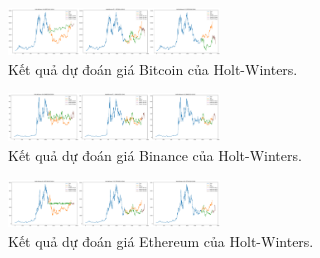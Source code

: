 \documentclass[conference]{IEEEtran}
\begin{document}
\subsubsection{}
\begin{figure}[H]
    \centering
    \includegraphics[width=0.5\textwidth]{bibliography/pictures/HWbtc.png}
    \caption{Kết quả dự đoán giá Bitcoin của Holt-Winters.}
\end{figure}
\begin{figure}[H]
    \centering
    \includegraphics[width=0.5\textwidth]{bibliography/pictures/HWbnb.png}
    \caption{Kết quả dự đoán giá Binance của Holt-Winters.}
\end{figure}
\begin{figure}[H]
    \centering
    \includegraphics[width=0.5\textwidth]{bibliography/pictures/HWeth.png}
    \caption{Kết quả dự đoán giá Ethereum của Holt-Winters.}
\end{figure}
\end{document}
